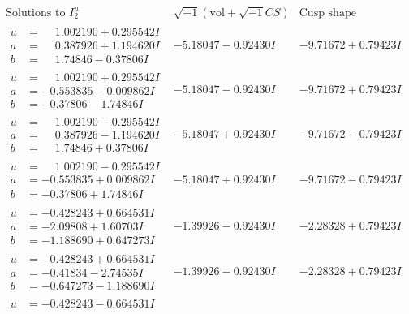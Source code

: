\documentclass[1p]{elsarticle_modified}
\theoremstyle{definition}
\newcommand{\I}{\sqrt{-1}}
\begin{document}
$$\begin{array}{c|c|c}  
\text{Solutions to }I^u_{2}& \I (\text{vol} + \sqrt{-1}CS) & \text{Cusp shape}\\
 \hline 
\begin{aligned}
u &= \phantom{-}1.002190 + 0.295542 I \\
a &= \phantom{-}0.387926 + 1.194620 I \\
b &= \phantom{-}1.74846 - 0.37806 I\end{aligned}
 & -5.18047 - 0.92430 I & -9.71672 + 0.79423 I \\ \hline\begin{aligned}
u &= \phantom{-}1.002190 + 0.295542 I \\
a &= -0.553835 - 0.009862 I \\
b &= -0.37806 - 1.74846 I\end{aligned}
 & -5.18047 - 0.92430 I & -9.71672 + 0.79423 I \\ \hline\begin{aligned}
u &= \phantom{-}1.002190 - 0.295542 I \\
a &= \phantom{-}0.387926 - 1.194620 I \\
b &= \phantom{-}1.74846 + 0.37806 I\end{aligned}
 & -5.18047 + 0.92430 I & -9.71672 - 0.79423 I \\ \hline\begin{aligned}
u &= \phantom{-}1.002190 - 0.295542 I \\
a &= -0.553835 + 0.009862 I \\
b &= -0.37806 + 1.74846 I\end{aligned}
 & -5.18047 + 0.92430 I & -9.71672 - 0.79423 I \\ \hline\begin{aligned}
u &= -0.428243 + 0.664531 I \\
a &= -2.09808 + 1.60703 I \\
b &= -1.188690 + 0.647273 I\end{aligned}
 & -1.39926 - 0.92430 I & -2.28328 + 0.79423 I \\ \hline\begin{aligned}
u &= -0.428243 + 0.664531 I \\
a &= -0.41834 - 2.74535 I \\
b &= -0.647273 - 1.188690 I\end{aligned}
 & -1.39926 - 0.92430 I & -2.28328 + 0.79423 I \\ \hline\begin{aligned}
u &= -0.428243 - 0.664531 I \\

\end{aligned}
\end{array}$$
\end{document}
